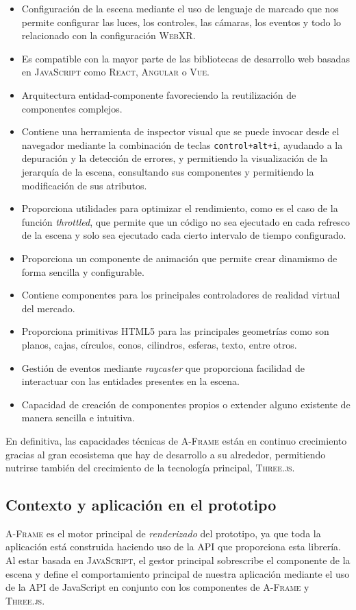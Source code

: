 \documentclass[a4paper, 11pt]{book}
\begin{document}
\begin{itemize}
    \item Configuración de la escena mediante el uso de lenguaje de marcado que nos permite configurar las luces, los controles, las cámaras, los eventos y todo lo relacionado con la configuración \textsc{WebXR}.
    \item Es compatible con la mayor parte de las bibliotecas de desarrollo web basadas en \textsc{JavaScript} como \textsc{React}, \textsc{Angular} o \textsc{Vue}.
    \item Arquitectura entidad-componente favoreciendo la reutilización de componentes complejos.
    \item Contiene una herramienta de inspector visual que se puede invocar desde el navegador mediante la combinación de teclas \texttt{control+alt+i}, ayudando a la depuración y la detección de errores, y permitiendo la visualización de la jerarquía de la escena, consultando sus componentes y permitiendo la modificación de sus atributos.
    \item Proporciona utilidades para optimizar el rendimiento, como es el caso de la función \emph{throttled}, que permite que un código no sea ejecutado en cada refresco de la escena y solo sea ejecutado cada cierto intervalo de tiempo configurado.
    \item Proporciona un componente de animación que permite crear dinamismo de forma sencilla y configurable.
    \item Contiene componentes para los principales controladores de realidad virtual del mercado.
    \item Proporciona primitivas \textsc{HTML5} para las principales geometrías como son planos, cajas, círculos, conos, cilindros, esferas, texto, entre otros.
    \item Gestión de eventos mediante \emph{raycaster} que proporciona facilidad de interactuar con las entidades presentes en la escena.
    \item Capacidad de creación de componentes propios o extender alguno existente de manera sencilla e intuitiva.
\end{itemize}

En definitiva, las capacidades técnicas de \textsc{A-Frame} están en continuo crecimiento gracias al gran ecosistema que hay de desarrollo a su alrededor, permitiendo nutrirse también del crecimiento de la tecnología principal, \textsc{Three.js}.
\subsection{Contexto y aplicación en el prototipo}
\textsc{A-Frame} es el motor principal de \emph{renderizado} del prototipo, ya que toda la aplicación está construida haciendo uso de la \textsc{API} que proporciona esta librería. Al estar basada en \textsc{JavaScript}, el gestor principal sobrescribe el componente de la escena y define el comportamiento principal de nuestra aplicación mediante el uso de la \textsc{API} de JavaScript en conjunto con los componentes de \textsc{A-Frame} y \textsc{Three.js}.
\end{document}
